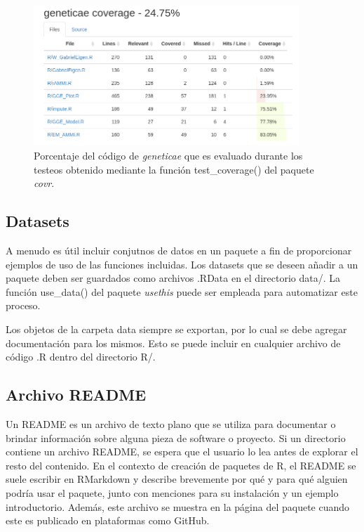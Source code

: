 \begin{figure}[H]
	\begin{center}
		\includegraphics[width=10cm]{./Graficos/Cobertura.png}	
	\end{center}
	\caption{Porcentaje del código de \emph{geneticae} que es evaluado durante los testeos obtenido mediante la función \textcolor{fandango}{test\_coverage()} del paquete \emph{covr}.}
	\label{fig:fig37}
\end{figure}


\subsection{Datasets}

A menudo es útil incluir conjutnos de datos en un paquete a fin de proporcionar ejemplos de uso de las funciones incluidas. Los datasets que se deseen añadir a un paquete deben ser guardados como archivos .RData en el directorio data/. La función \textcolor{fandango}{use\_data()} del paquete \emph{usethis} puede ser empleada para automatizar este proceso.

Los objetos de la carpeta data siempre se exportan, por lo cual se debe agregar documentación para los mismos. Esto se puede incluir en cualquier archivo de código .R dentro del directorio R/. 


\subsection{Archivo README}

Un README es un archivo de texto plano que se utiliza para documentar o brindar información sobre alguna pieza de software o proyecto. Si un directorio contiene un archivo README, se espera que el usuario lo lea antes de explorar el resto del contenido. En el contexto de creación de paquetes de R, el README se suele escribir en RMarkdown y describe brevemente por qué y para qué alguien podría usar el paquete, junto con menciones para su instalación y un ejemplo introductorio. Además, este archivo se muestra en la página del paquete cuando este es publicado en plataformas como GitHub. 

